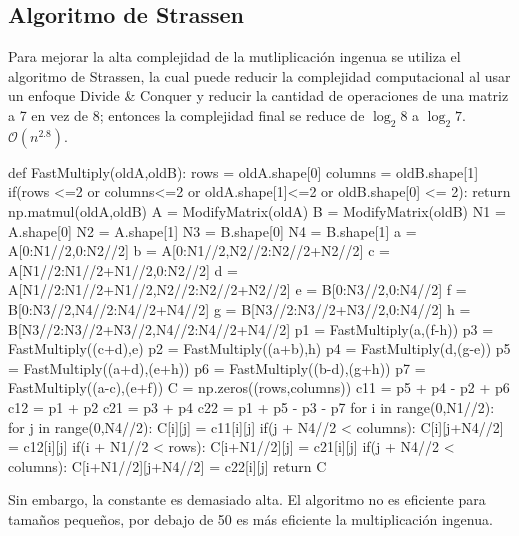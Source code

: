 \documentclass[12pt,a3paper]{article}
\begin{document}
\subsection{Algoritmo de Strassen}
Para mejorar la alta complejidad de la mutliplicación ingenua se utiliza el algoritmo de Strassen, la cual puede reducir la complejidad computacional al usar un enfoque Divide \& Conquer y reducir la cantidad de operaciones de una matriz a 7 en vez de 8; entonces la complejidad final se reduce de $\log_{2} 8$ a $\log_{2} 7$. $\mathcal{O}(n^{2.8})$.
\begin{pyglist}[language=python,caption={Multiplicación Rápida:\hspace{5pt} $\mathcal{O}(n^{\log_{2} 7})$},
style=pastie]
def FastMultiply(oldA,oldB):
    rows = oldA.shape[0]
    columns = oldB.shape[1]
    if(rows <=2 or columns<=2 or oldA.shape[1]<=2 or oldB.shape[0] <= 2):
        return np.matmul(oldA,oldB) 
    A = ModifyMatrix(oldA)
    B = ModifyMatrix(oldB)
    N1 = A.shape[0]
    N2 = A.shape[1]
    N3 = B.shape[0]
    N4 = B.shape[1]
    a = A[0:N1//2,0:N2//2]
    b = A[0:N1//2,N2//2:N2//2+N2//2]
    c = A[N1//2:N1//2+N1//2,0:N2//2]
    d = A[N1//2:N1//2+N1//2,N2//2:N2//2+N2//2]
    e = B[0:N3//2,0:N4//2]
    f = B[0:N3//2,N4//2:N4//2+N4//2]
    g = B[N3//2:N3//2+N3//2,0:N4//2]
    h = B[N3//2:N3//2+N3//2,N4//2:N4//2+N4//2]
    p1 = FastMultiply(a,(f-h))
    p3 = FastMultiply((c+d),e)
    p2 = FastMultiply((a+b),h)
    p4 = FastMultiply(d,(g-e))
    p5 = FastMultiply((a+d),(e+h))
    p6 = FastMultiply((b-d),(g+h))
    p7 = FastMultiply((a-c),(e+f))
    C = np.zeros((rows,columns))
    c11 = p5 + p4 - p2 + p6
    c12 = p1 + p2
    c21 = p3 + p4
    c22 = p1 + p5 - p3 - p7
    for i in range(0,N1//2):
        for j in range(0,N4//2):
            C[i][j] = c11[i][j]
            if(j + N4//2 < columns):
                C[i][j+N4//2] = c12[i][j]
            if(i + N1//2 < rows):
                C[i+N1//2][j] = c21[i][j]
                if(j + N4//2 < columns):
                    C[i+N1//2][j+N4//2] = c22[i][j]
    return C
\end{pyglist}
Sin embargo, la constante es demasiado alta. El algoritmo no es eficiente para tamaños pequeños, por debajo de 50 es más eficiente la multiplicación ingenua.
\end{document}
